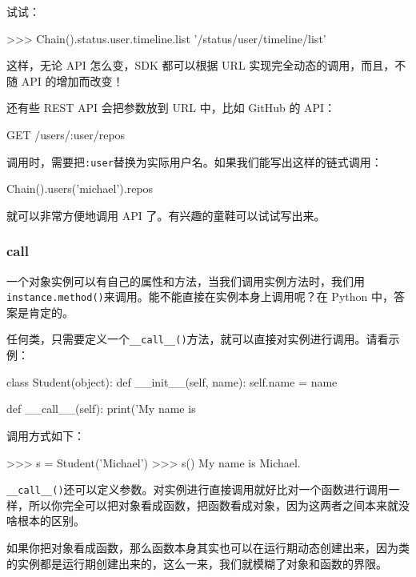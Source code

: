 试试：

\begin{pythoncode}
>>> Chain().status.user.timeline.list
'/status/user/timeline/list'
\end{pythoncode}

这样，无论 API 怎么变，SDK 都可以根据 URL 实现完全动态的调用，而且，不随
API 的增加而改变！

还有些 REST API 会把参数放到 URL 中，比如 GitHub 的 API：

\begin{pythoncode}
GET /users/:user/repos
\end{pythoncode}

调用时，需要把\texttt{:user}替换为实际用户名。如果我们能写出这样的链式调用：

\begin{pythoncode}
Chain().users('michael').repos
\end{pythoncode}

就可以非常方便地调用 API 了。有兴趣的童鞋可以试试写出来。

\hypertarget{call}{%
\subsubsection{\texorpdfstring{\textbf{call}}{call}}\label{call}}

一个对象实例可以有自己的属性和方法，当我们调用实例方法时，我们用\texttt{instance.method()}来调用。能不能直接在实例本身上调用呢？在
Python 中，答案是肯定的。

任何类，只需要定义一个\texttt{\_\_call\_\_()}方法，就可以直接对实例进行调用。请看示例：

\begin{pythoncode}
class Student(object):
    def __init__(self, name):
        self.name = name

    def __call__(self):
        print('My name is %
\end{pythoncode}

调用方式如下：

\begin{pythoncode}
>>> s = Student('Michael')
>>> s() 
My name is Michael.
\end{pythoncode}

\texttt{\_\_call\_\_()}还可以定义参数。对实例进行直接调用就好比对一个函数进行调用一样，所以你完全可以把对象看成函数，把函数看成对象，因为这两者之间本来就没啥根本的区别。

如果你把对象看成函数，那么函数本身其实也可以在运行期动态创建出来，因为类的实例都是运行期创建出来的，这么一来，我们就模糊了对象和函数的界限。

